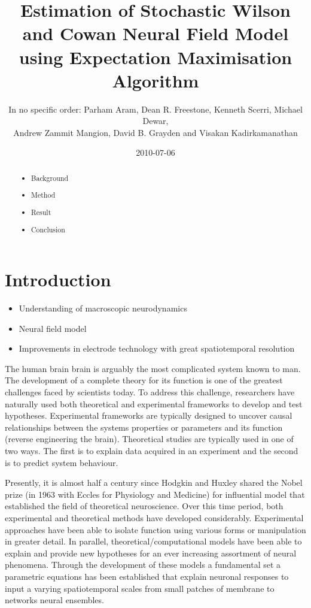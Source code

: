 \documentclass[]{article}
\title{Estimation of Stochastic Wilson and Cowan Neural Field Model using Expectation Maximisation Algorithm}
\author{In no specific order: Parham Aram, Dean R. Freestone, Kenneth Scerri, Michael Dewar,\\
 Andrew Zammit Mangion, David B. Grayden and Visakan Kadirkamanathan  }
\date{2010-07-06}
\newif\ifpdf
\begin{document}
\ifpdf
\DeclareGraphicsExtensions{.pdf, .jpg, .tif}
\else
{}
\fi

\maketitle


\begin{abstract}
	
	\begin{itemize}
		\item Background
		\item Method
		\item Result
		\item Conclusion
	\end{itemize}
\end{abstract}

\section{Introduction}
\begin{itemize}
	\item Understanding of macroscopic neurodynamics
	\item Neural field model
	\item Improvements in electrode technology with great spatiotemporal resolution


\end{itemize}

The human brain brain is arguably the most complicated system known to man. The development of a complete theory for its function is one of the greatest challenges faced by scientists today. To address this challenge, researchers have naturally used both theoretical and experimental frameworks to develop and test hypotheses. Experimental frameworks are typically designed to uncover causal relationships between the systems properties or parameters and its function (reverse engineering the brain). Theoretical studies are typically used in one of two ways. The first is to explain data acquired in an experiment and the second is to predict system behaviour. 

Presently, it is almost half a century since Hodgkin and Huxley shared the Nobel prize (in 1963 with Eccles for Physiology and Medicine) for influential model that established the field of theoretical neuroscience. Over this time period, both experimental and theoretical methods have developed considerably. Experimental approaches have been able to isolate function using various forms or manipulation in greater detail. In parallel, theoretical/computational models have been able to explain and provide new hypotheses for an ever increasing assortment of neural phenomena. Through the development of these models a fundamental set a parametric equations has been established that explain neuronal responses to input a varying spatiotemporal scales from small patches of membrane to networks neural ensembles.
\end{document}
